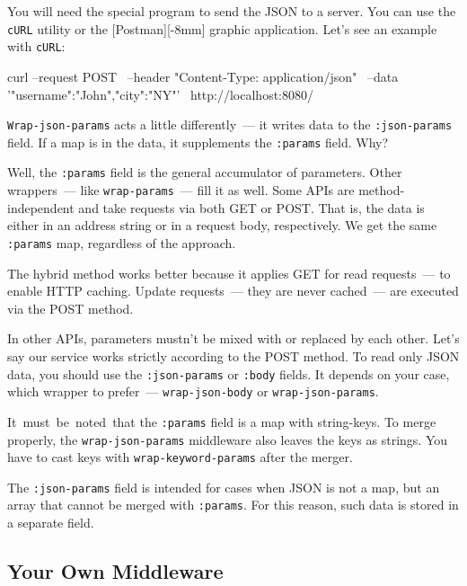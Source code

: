 
You will need the special program to send the JSON to a server. You can use the \verb|cURL| utility or the [Post\-man][-8mm] graphic application.  Let's see an example with \verb|cURL|:

\begin{english}
\begin{bash}
curl --request POST \
--header "Content-Type: application/json" \
--data '{"username":"John","city":"NY"}' \
http://localhost:8080/
\end{bash}
\end{english}

\verb|Wrap-json-params| acts a little differently~--- it writes data to the \verb|:json-params| field. If a map is in the data, it supplements the \verb|:params| field. Why?

Well, the \verb|:params| field is the general accumulator of parameters. Other wrappers~--- like \verb|wrap-params|~--- fill it as well. Some APIs are method-independent and take requests via both GET or POST. That is, the data is either in an address string or in a request body, respectively. We get the same \verb|:params| map, regardless of the approach.

The hybrid method works better because it applies GET for read requests~--- to enable HTTP caching.  Update requests~--- they are never cached~--- are executed
via the POST method.

In other APIs, parameters mustn't be mixed with or replaced by each other. Let's say our service works strictly according to the POST method. To read only JSON data, you should use the \verb|:json-params| or \verb|:body| fields. It depends on your case, which wrapper to prefer~--- \verb|wrap-json-body| or \verb|wrap-json-params|.


It must be noted that the \verb|:params| field is a map with string-keys. To merge properly, the \verb|wrap-json-params| middleware also leaves the keys as strings. You have to cast keys with \verb|wrap-keyword-params| after the merger.

The \verb|:json-params| field is intended for cases when JSON is not a map, but an array that cannot be merged with \verb|:params|. For this reason, such data is stored in a separate field.

\subsection{Your Own Middleware}

